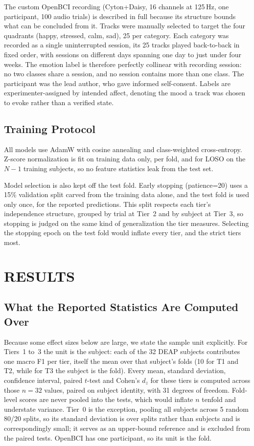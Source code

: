 \documentclass[conference,a4paper]{IEEEtran}
\begin{document}
The custom OpenBCI recording (Cyton+Daisy, 16 channels at 125\,Hz, one participant, 100 audio trials) is described in full because its structure bounds what can be concluded from it. Tracks were manually selected to target the four quadrants (happy, stressed, calm, sad), 25 per category. Each category was recorded as a single uninterrupted session, its 25 tracks played back-to-back in fixed order, with sessions on different days spanning one day to just under four weeks. The emotion label is therefore perfectly collinear with recording session: no two classes share a session, and no session contains more than one class. The participant was the lead author, who gave informed self-consent. Labels are experimenter-assigned by intended affect, denoting the mood a track was chosen to evoke rather than a verified state.

\subsection{Training Protocol}

All models use AdamW with cosine annealing and class-weighted cross-entropy. Z-score normalization is fit on training data only, per fold, and for LOSO on the $N{-}1$ training subjects, so no feature statistics leak from the test set.

Model selection is also kept off the test fold. Early stopping (patience=20) uses a 15\% validation split carved from the training data alone, and the test fold is used only once, for the reported predictions. This split respects each tier's independence structure, grouped by trial at Tier~2 and by subject at Tier~3, so stopping is judged on the same kind of generalization the tier measures. Selecting the stopping epoch on the test fold would inflate every tier, and the strict tiers most.

\section{RESULTS}

\subsection{What the Reported Statistics Are Computed Over}
\label{sec:statunit}

Because some effect sizes below are large, we state the sample unit explicitly. For Tiers~1 to~3 the unit is the subject: each of the 32 DEAP subjects contributes one macro F1 per tier, itself the mean over that subject's folds (10 for T1 and T2, while for T3 the subject is the fold). Every mean, standard deviation, confidence interval, paired $t$-test and Cohen's $d_z$ for these tiers is computed across those $n=32$ values, paired on subject identity, with 31 degrees of freedom. Fold-level scores are never pooled into the tests, which would inflate $n$ tenfold and understate variance. Tier~0 is the exception, pooling all subjects across 5 random 80/20 splits, so its standard deviation is over splits rather than subjects and is correspondingly small; it serves as an upper-bound reference and is excluded from the paired tests. OpenBCI has one participant, so its unit is the fold.
\end{document}
